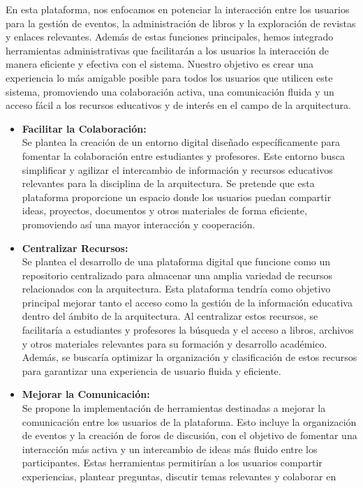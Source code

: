 \documentclass[a4paper, 12pt]{book}
\begin{document}
En esta plataforma, nos enfocamos en potenciar la interacción entre los usuarios para la gestión de eventos, la administración de libros y la exploración de revistas y enlaces relevantes. Además de estas funciones principales, hemos integrado herramientas administrativas que facilitarán a los usuarios la interacción de manera eficiente y efectiva con el sistema. Nuestro objetivo es crear una experiencia lo más amigable posible para todos los usuarios que utilicen este sistema, promoviendo una colaboración activa, una comunicación fluida y un acceso fácil a los recursos educativos y de interés en el campo de la arquitectura.
\begin{itemize}
  \item \textbf{Facilitar la Colaboración: } \\ 
  Se plantea la creación de un entorno digital diseñado específicamente para fomentar la colaboración entre estudiantes y profesores. Este entorno busca simplificar 
  y agilizar el intercambio de información y recursos educativos relevantes para la disciplina de la arquitectura. Se pretende que esta plataforma proporcione un 
  espacio donde los usuarios puedan compartir ideas, proyectos, documentos y otros materiales de forma eficiente, promoviendo así una mayor interacción y cooperación.
  \item \textbf{Centralizar Recursos: } \\ Se plantea el desarrollo de una plataforma digital que funcione como un repositorio centralizado para almacenar una 
  amplia variedad de recursos relacionados con la arquitectura. Esta plataforma tendría como objetivo principal mejorar tanto el acceso como la gestión de la 
  información educativa dentro del ámbito de la arquitectura. Al centralizar estos recursos, se facilitaría a estudiantes y profesores la búsqueda y el acceso a 
  libros, archivos y otros materiales relevantes para su formación y desarrollo académico. Además, se buscaría optimizar la organización y clasificación de estos 
  recursos para garantizar una experiencia de usuario fluida y eficiente.
  \item \textbf{Mejorar la Comunicación: } \\ Se propone la implementación de herramientas destinadas a mejorar la comunicación entre los usuarios de la plataforma. 
  Esto incluye la organización de eventos y la creación de foros de discusión, con el objetivo de fomentar una interacción más activa y un intercambio de ideas más 
  fluido entre los participantes. Estas herramientas permitirían a los usuarios compartir experiencias, plantear preguntas, discutir temas relevantes y colaborar en 

\end{itemize}
\end{document}
